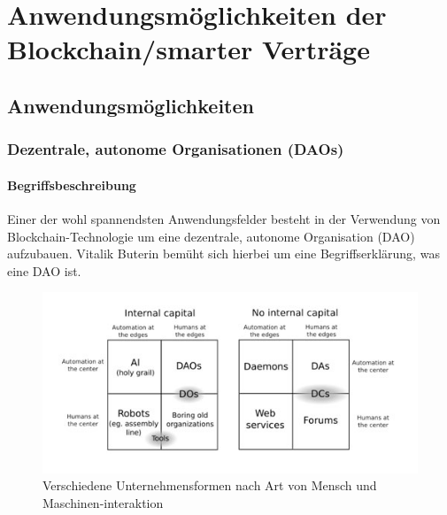 \chapter{Anwendungsmöglichkeiten der Blockchain/smarter Verträge}\label{chapter_anwendungsmöglichkeiten}
\section{Anwendungsmöglichkeiten}
\subsection{Dezentrale, autonome Organisationen (DAOs)}
\subsubsection{Begriffsbeschreibung}
Einer der wohl spannendsten Anwendungsfelder besteht in der Verwendung von Blockchain-Technologie um eine dezentrale, autonome Organisation (DAO) aufzubauen. Vitalik Buterin bemüht sich hierbei um eine Begriffserklärung, was eine DAO ist.

\begin{figure}[ht]
	\centering
	\includegraphics[scale=0.75]{grafiken/Abgrenzung_DAO.png}
	\caption{Verschiedene Unternehmensformen nach Art von Mensch und Maschinen-interaktion \cite{Buterin.2014c}}
	\label{dao_abgrenzung}
\end{figure}

